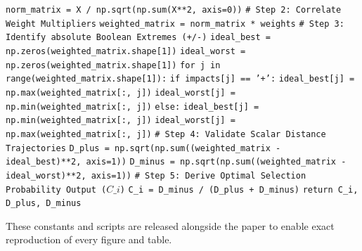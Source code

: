 \begin{algorithm*}[htbp]
\begin{algorithmic}[1]
\State \indent \texttt{norm\_matrix = X / np.sqrt(np.sum(X**2, axis=0))}
\State
\State \indent \texttt{\# Step 2: Correlate Weight Multipliers}
\State \indent \texttt{weighted\_matrix = norm\_matrix * weights}
\State
\State \indent \texttt{\# Step 3: Identify absolute Boolean Extremes (+/-)}
\State \indent \texttt{ideal\_best = np.zeros(weighted\_matrix.shape[1])}
\State \indent \texttt{ideal\_worst = np.zeros(weighted\_matrix.shape[1])}
\State \indent \texttt{for j in range(weighted\_matrix.shape[1]):}
\State \indent \indent \texttt{if impacts[j] == '+':} 
\State \indent \indent \indent \texttt{ideal\_best[j] = np.max(weighted\_matrix[:, j])}
\State \indent \indent \indent \texttt{ideal\_worst[j] = np.min(weighted\_matrix[:, j])}
\State \indent \indent \texttt{else:} 
\State \indent \indent \indent \texttt{ideal\_best[j] = np.min(weighted\_matrix[:, j])}
\State \indent \indent \indent \texttt{ideal\_worst[j] = np.max(weighted\_matrix[:, j])}
\State
\State \indent \texttt{\# Step 4: Validate Scalar Distance Trajectories}
\State \indent \texttt{D\_plus = np.sqrt(np.sum((weighted\_matrix - ideal\_best)**2, axis=1))}
\State \indent \texttt{D\_minus = np.sqrt(np.sum((weighted\_matrix - ideal\_worst)**2, axis=1))}
\State
\State \indent \texttt{\# Step 5: Derive Optimal Selection Probability Output ($C\_i$)}
\State \indent \texttt{C\_i = D\_minus / (D\_plus + D\_minus)}
\State \indent \texttt{return C\_i, D\_plus, D\_minus}
\end{algorithmic}
\end{algorithm*}


These constants and scripts are released alongside the paper to enable exact reproduction of every figure and table.
